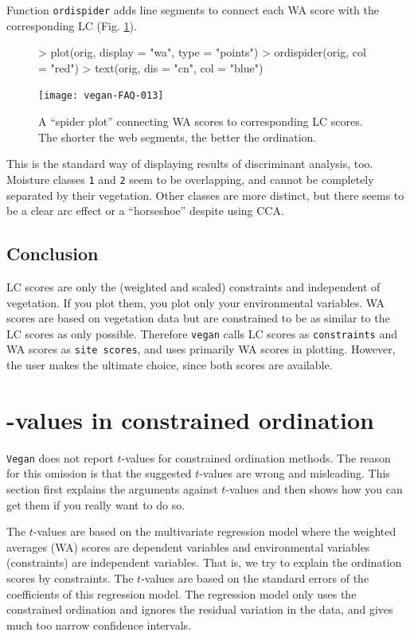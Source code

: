 \documentclass[a4paper]{article}
\begin{document}
Function \texttt{ordispider} adds line segments to connect each WA
score with the corresponding LC (Fig.  \ref{fig:walcspider}).
\begin{figure}
\begin{center}
\begin{Schunk}
\begin{Sinput}
> plot(orig, display = "wa", type = "points")
> ordispider(orig, col = "red")
> text(orig, dis = "cn", col = "blue")
\end{Sinput}
\end{Schunk}
\texttt{[image: vegan-FAQ-013]}
\caption{A ``spider plot'' connecting WA scores to corresponding LC
  scores. The shorter the web segments, the better the ordination.}
\label{fig:walcspider}
\end{center}
\end{figure}
This is the standard way of displaying results of discriminant
analysis, too.  Moisture classes \texttt{1} and \texttt{2} seem to be
overlapping, and cannot be completely separated by their 
vegetation. Other classes are more distinct, but there seems to be a
clear arc effect or a ``horseshoe'' despite using CCA. 

\subsection{Conclusion}

LC scores are only the (weighted and scaled) constraints and
independent of vegetation. If you plot them, you plot only your
environmental variables. WA scores are based on vegetation data but
are constrained to be as similar to the LC scores as only
possible. Therefore \texttt{vegan} calls LC scores as
\texttt{constraints} and WA scores as \texttt{site scores}, and uses
primarily WA scores in plotting.  However, the user makes the ultimate
choice, since both scores are available.

\section{-values in constrained ordination}


\texttt{Vegan} does not report $t$-values for constrained ordination
methods.  The reason for this omission is that the suggested
$t$-values are wrong and misleading.  This section first explains the
arguments against $t$-values and then shows how you can get them if
you really want to do so.

The $t$-values are based on the multivariate regression model where
the weight\-ed averages (WA) scores are dependent variables and
environmental variables (constraints) are independent variables. That
is, we try to explain the ordination scores by constraints.  The
$t$-values are based on the standard errors of the coefficients of
this regression model.  The regression model only uses the constrained
ordination and ignores the residual variation
in the data, and gives much too narrow confidence intervals.
\end{document}
